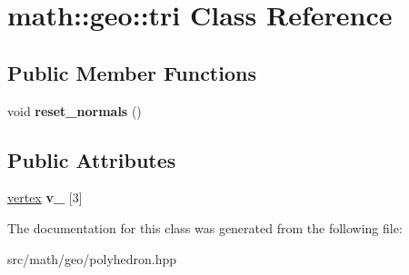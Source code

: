 \hypertarget{classmath_1_1geo_1_1tri}{
\section{math::geo::tri Class Reference}
\label{classmath_1_1geo_1_1tri}
}
\subsection*{Public Member Functions}
\begin{DoxyCompactItemize}
\item 
\hypertarget{classmath_1_1geo_1_1tri_a9781ddeac1d6e0795ede6818f1ca52b8}{
void {\bfseries reset\_\-normals} ()}
\label{classmath_1_1geo_1_1tri_a9781ddeac1d6e0795ede6818f1ca52b8}

\end{DoxyCompactItemize}
\subsection*{Public Attributes}
\begin{DoxyCompactItemize}
\item 
\hypertarget{classmath_1_1geo_1_1tri_a1578bb4ca85d7adabc44b48e1fbbbe29}{
\hyperlink{classmath_1_1geo_1_1vertex}{vertex} {\bfseries v\_\-} \mbox{[}3\mbox{]}}
\label{classmath_1_1geo_1_1tri_a1578bb4ca85d7adabc44b48e1fbbbe29}

\end{DoxyCompactItemize}


The documentation for this class was generated from the following file:\begin{DoxyCompactItemize}
\item 
src/math/geo/polyhedron.hpp\end{DoxyCompactItemize}
